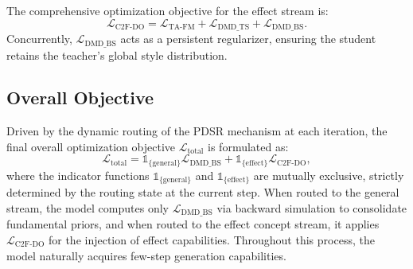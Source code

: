 The comprehensive optimization objective for the effect stream is:
\begin{equation}
\mathcal{L}_{\text{C2F-DO}} = \mathcal{L}_{\text{TA-FM}} + \mathcal{L}_{\text{DMD\_TS}} + \mathcal{L}_{\text{DMD\_BS}}.
\end{equation}
Concurrently, $\mathcal{L}_{\text{DMD\_BS}}$ acts as a persistent regularizer, ensuring the student retains the teacher's global style distribution.


\subsection{Overall Objective}\label{method:4_5}
Driven by the dynamic routing of the PDSR mechanism at each iteration, the final overall optimization objective $\mathcal{L}_{\text{total}}$ is formulated as:
\begin{equation}
\mathcal{L}_{\text{total}} = \mathbb{1}_{\{\text{general}\}} \mathcal{L}_{\text{DMD\_BS}} + \mathbb{1}_{\{\text{effect}\}} \mathcal{L}_{\text{C2F-DO}},
\end{equation}
where the indicator functions $\mathbb{1}_{\{\text{general}\}}$ and $\mathbb{1}_{\{\text{effect}\}}$ are mutually exclusive, strictly determined by the routing state at the current step.
When routed to the general stream, the model computes only $\mathcal{L}_{\text{DMD\_BS}}$ via backward simulation to consolidate fundamental priors, and when routed to the effect concept stream, it applies $\mathcal{L}_{\text{C2F-DO}}$ for the injection of effect capabilities. Throughout this process, the model naturally acquires few-step generation capabilities.
